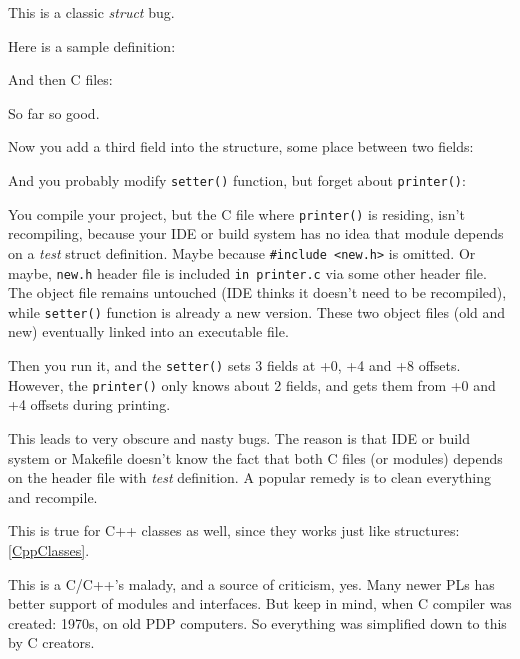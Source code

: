 
This is a classic \emph{struct} bug.

Here is a sample definition:



And then C files:





So far so good.

Now you add a third field into the structure, some place between two fields:



And you probably modify \verb|setter()| function, but forget about \verb|printer()|:



You compile your project, but the C file where \verb|printer()| is residing, isn't recompiling,
because your \ac{IDE} or build system
has no idea that module depends on a \emph{test} struct definition.
Maybe because \verb|#include <new.h>| is omitted.
Or maybe, \verb|new.h| header file is included \verb|in printer.c| via some other header file.
The object file remains untouched (\ac{IDE} thinks it doesn't need to be recompiled),
while \verb|setter()| function is already a new version.
These two object files (old and new) eventually linked into an executable file.

Then you run it, and the \verb|setter()| sets 3 fields at +0, +4 and +8 offsets.
However, the \verb|printer()| only knows about 2 fields, and gets them from +0 and +4 offsets during printing.

This leads to very obscure and nasty bugs.
The reason is that \ac{IDE} or build system or Makefile doesn't know the fact that both C files (or modules) depends on the header
file with \emph{test} definition.
A popular remedy is to clean everything and recompile.

This is true for C++ classes as well, since they works just like structures: \ref{CppClasses}.

This is a C/C++'s malady, and a source of criticism, yes.
Many newer \ac{PL}s has better support of modules and interfaces.
But keep in mind, when C compiler was created: 1970s, on old PDP computers.
So everything was simplified down to this by C creators.

